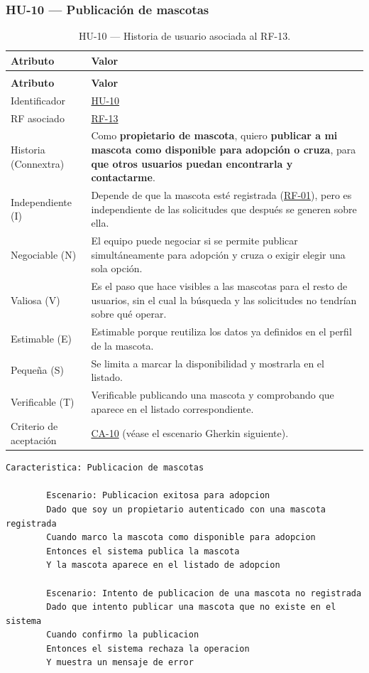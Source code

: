 \documentclass[journal,onecolumn]{IEEEtran}
\makeatletter
\newenvironment{atributos}[2]{%
	\small
	\begin{longtable}{@{}>{\raggedright\arraybackslash}p{4.2cm} >{\raggedright\arraybackslash}p{11.2cm}@{}}
		\caption{#2}\label{tab:#1}\\
		\toprule
		\textbf{Atributo} & \textbf{Valor} \\
		\midrule
		\endfirsthead
		\multicolumn{2}{@{}l}{\small\itshape (continuación)}\\
		\toprule
		\textbf{Atributo} & \textbf{Valor} \\
		\midrule
		\endhead
		\bottomrule
		\endlastfoot
	}{%
	\end{longtable}
	\normalsize
}
\makeatother
\begin{document}
	\subsubsection{HU-10 --- Publicación de mascotas}
	
	\begin{atributos}{HU-10}{HU-10 --- Historia de usuario asociada al RF-13.}
		Identificador & \hyperref[tab:HU-10]{HU-10} \\
		RF asociado & \hyperref[tab:RF-13]{RF-13} \\
		Historia (Connextra) & Como \textbf{propietario de mascota}, quiero \textbf{publicar a mi mascota como disponible para adopción o cruza}, para \textbf{que otros usuarios puedan encontrarla y contactarme}. \\
		Independiente (I) & Depende de que la mascota esté registrada (\hyperref[tab:RF-01]{RF-01}), pero es independiente de las solicitudes que después se generen sobre ella. \\
		Negociable (N) & El equipo puede negociar si se permite publicar simultáneamente para adopción y cruza o exigir elegir una sola opción. \\
		Valiosa (V) & Es el paso que hace visibles a las mascotas para el resto de usuarios, sin el cual la búsqueda y las solicitudes no tendrían sobre qué operar. \\
		Estimable (E) & Estimable porque reutiliza los datos ya definidos en el perfil de la mascota. \\
		Pequeña (S) & Se limita a marcar la disponibilidad y mostrarla en el listado. \\
		Verificable (T) & Verificable publicando una mascota y comprobando que aparece en el listado correspondiente. \\
		Criterio de aceptación & \hyperref[lst:ca10]{CA-10} (véase el escenario Gherkin siguiente). \\
	\end{atributos}
	
	\begin{lstlisting}[style=gherkin,caption={CA-10 --- Escenario de aceptación de la historia HU-10.},label={lst:ca10}]
		Caracteristica: Publicacion de mascotas
		
		Escenario: Publicacion exitosa para adopcion
		Dado que soy un propietario autenticado con una mascota registrada
		Cuando marco la mascota como disponible para adopcion
		Entonces el sistema publica la mascota
		Y la mascota aparece en el listado de adopcion
		
		Escenario: Intento de publicacion de una mascota no registrada
		Dado que intento publicar una mascota que no existe en el sistema
		Cuando confirmo la publicacion
		Entonces el sistema rechaza la operacion
		Y muestra un mensaje de error
	\end{lstlisting}
	
\end{document}
